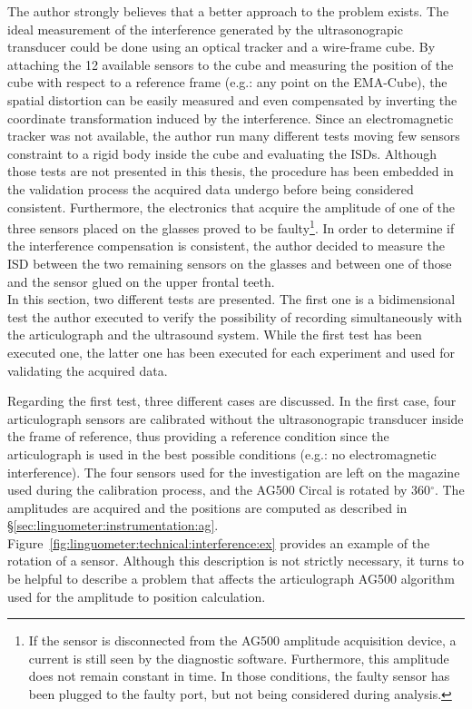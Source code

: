 The author strongly believes that a better approach to the problem exists.
The ideal measurement of the interference generated by the ultrasonograpic
transducer could be done using an optical tracker and a wire-frame cube.
By attaching the 12 available sensors to the cube and measuring the position 
of the cube with respect to a reference frame (e.g.: any point on the  
EMA-Cube), the spatial distortion can be easily measured and even compensated by
inverting the coordinate transformation induced by the interference.
Since an electromagnetic tracker was not available, the author run many
different tests moving few sensors constraint to a rigid body inside the cube 
and evaluating the ISDs.
Although those tests are not presented in this thesis, the procedure has been 
embedded in the validation process the acquired data undergo before being
considered consistent.
Furthermore, the electronics that acquire the amplitude of one of the three 
sensors placed on the glasses proved to be faulty\footnote{If the sensor is
disconnected from the AG500 amplitude acquisition device, a current is still
seen by the diagnostic software. Furthermore, this amplitude does not remain
constant in time. In those conditions, the faulty sensor has been plugged to the
faulty port, but not being considered during analysis.}.
In order to determine if the interference compensation is consistent, the author
decided to measure the ISD between the two remaining sensors on the glasses and
between one of those and the sensor glued on the upper frontal teeth.\\


In this section, two different tests are presented. The first one is a
bidimensional test the author executed to verify the possibility of
recording  simultaneously with the articulograph and the ultrasound system.
While the first test has been executed one, the latter one has been executed for
each experiment and used for validating the acquired data.

Regarding the first test, three different cases are discussed.
In the first case, four articulograph sensors are calibrated without the 
ultrasonograpic transducer inside the frame of reference, thus
providing a reference condition since the articulograph is used in the best
possible conditions (e.g.: no electromagnetic interference).
The four sensors used for the investigation are left on the magazine used during
the calibration process, and the AG500 Circal is rotated by 360$^{\circ}$.
The amplitudes are acquired and the positions are computed as described in
\S\ref{sec:linguometer:instrumentation:ag}.
Figure~\ref{fig:linguometer:technical:interference:ex} provides an example
of the rotation of a sensor. Although this description is not strictly
necessary, it turns to be helpful to describe a problem that affects the 
articulograph AG500 algorithm used for the amplitude to position calculation.

